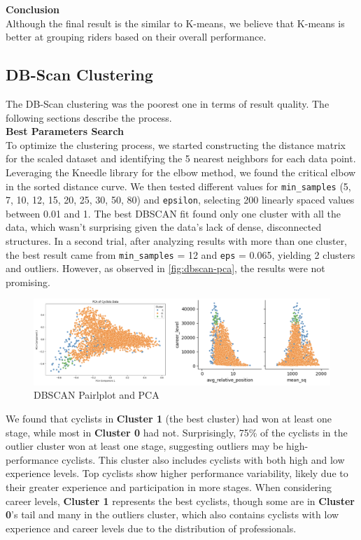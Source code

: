 \noindent\textbf{Conclusion}\\
Although the final result is the similar to K-means, we believe that K-means is better at grouping riders based on their overall performance.

\subsection{DB-Scan Clustering}
The DB-Scan clustering was the poorest one in terms of result quality. The following sections describe the process.\\

\noindent\textbf{Best Parameters Search}\\
To optimize the clustering process, we started constructing the distance matrix for the scaled dataset and identifying the 5 nearest neighbors for each data point. Leveraging the Kneedle library for the elbow method, we found the critical elbow in the sorted distance curve. We then tested different values for \texttt{min\_samples} (5, 7, 10, 12, 15, 20, 25, 30, 50, 80) and \texttt{epsilon}, selecting 200 linearly spaced values between 0.01 and 1. The best DBSCAN fit found only one cluster with all the data, which wasn't surprising given the data's lack of dense, disconnected structures. In a second trial, after analyzing results with more than one cluster, the best result came from \texttt{min\_samples} = 12 and \texttt{eps} = 0.065, yielding 2 clusters and outliers. However, as observed in \autoref{fig:dbscan-pca}, the results were not promising.

\begin{figure}[h]
    \centering
    \includegraphics[width=0.8\linewidth]{images/CLUSTER/dbscan/pca.png}
    \caption{ \small DBSCAN Pairlplot and PCA}
    \label{fig:dbscan-pca}
\end{figure}

\noindent We found that cyclists in \textbf{Cluster 1} (the best cluster) had won at least one stage, while most in \textbf{Cluster 0} had not. Surprisingly, 75\% of the cyclists in the outlier cluster won at least one stage, suggesting outliers may be high-performance cyclists. This cluster also includes cyclists with both high and low experience levels. Top cyclists show higher performance variability, likely due to their greater experience and participation in more stages. When considering career levels, \textbf{Cluster 1} represents the best cyclists, though some are in \textbf{Cluster 0}'s tail and many in the outliers cluster, which also contains cyclists with low experience and career levels due to the distribution of professionals.\\

